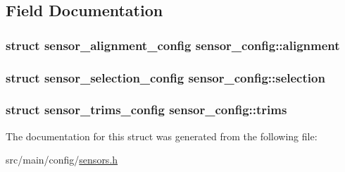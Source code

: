 \subsection{Field Documentation}
\hypertarget{structsensor__config_a077e791b94c457137bf03bb5e2e2afe6}{
\subsubsection[{alignment}]{\setlength{\rightskip}{0pt plus 5cm}struct {\bf sensor\+\_\+alignment\+\_\+config} sensor\+\_\+config\+::alignment}}\label{structsensor__config_a077e791b94c457137bf03bb5e2e2afe6}
\hypertarget{structsensor__config_a19ca24e8e7a3296ca8c277a6368c65c9}{
\subsubsection[{selection}]{\setlength{\rightskip}{0pt plus 5cm}struct {\bf sensor\+\_\+selection\+\_\+config} sensor\+\_\+config\+::selection}}\label{structsensor__config_a19ca24e8e7a3296ca8c277a6368c65c9}
\hypertarget{structsensor__config_aa0d0e322ad09472e27b04c80df14e4f1}{
\subsubsection[{trims}]{\setlength{\rightskip}{0pt plus 5cm}struct {\bf sensor\+\_\+trims\+\_\+config} sensor\+\_\+config\+::trims}}\label{structsensor__config_aa0d0e322ad09472e27b04c80df14e4f1}


The documentation for this struct was generated from the following file\+:\begin{DoxyCompactItemize}
\item 
src/main/config/\hyperlink{sensors_8h}{sensors.\+h}\end{DoxyCompactItemize}
